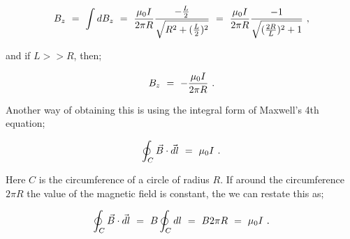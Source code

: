 \documentclass{article}
\begin{document}
\begin{equation} \label{eb-eq-51-12}
B_z \hspace{0.125cm} = \hspace{0.125cm} \int d B_z \hspace{0.125cm} = \hspace{0.125cm} \frac{\mu_{0} I}{2 \pi R} \frac{- \frac{L}{2}}{\sqrt{R^2 + (\frac{L}{2})^2}} \hspace{0.125cm} = \hspace{0.125cm} \frac{\mu_{0} I}{2 \pi R} \frac{-1}{\sqrt{(\frac{2R}{L})^2 + 1}} \hspace{0.125cm} ,
\end{equation}

and if \begin{math} L >> R \end{math}, then;

\begin{equation} \label{eb-eq-51-13}
B_z \hspace{0.125cm} = \hspace{0.125cm} - \frac{\mu_{0} I}{2 \pi R} \hspace{0.125cm} .
\end{equation}

Another way of obtaining this is using the integral form of Maxwell's 4th equation;

\begin{equation} \label{eb-eq-51-14}
\oint_{C} \vec{B} \cdot \vec{dl} \hspace{0.125cm} = \hspace{0.125cm} \mu_{0} I \hspace{0.125cm} .
\end{equation}

Here \begin{math} C \end{math} is the circumference of a circle of radius \begin{math} R \end{math}. If around the circumference \begin{math} 2\pi R \end{math} the value of the magnetic field is constant, the we can restate this as;

\begin{equation} \label{eb-eq-51-15}
\oint_{C} \vec{B} \cdot \vec{dl} \hspace{0.125cm} = \hspace{0.125cm} B \oint_{C} {dl} \hspace{0.125cm} = \hspace{0.125cm} B 2\pi R \hspace{0.125cm} = \hspace{0.125cm} \mu_{0} I \hspace{0.125cm} .
\end{equation}
\end{document}
